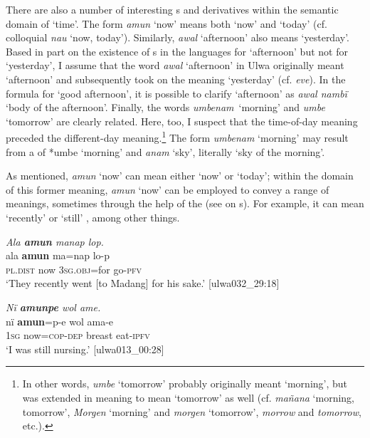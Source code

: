   There are also a number of interesting s and derivatives within the semantic domain of ‘time’. The form \textit{amun} ‘now’ means both ‘now’ and ‘today’ (cf. colloquial  \textit{nau} ‘now, today’). Similarly, \textit{awal} ‘afternoon’ also means ‘yesterday’. Based in part on the existence of s in the  languages for ‘afternoon’ but not for ‘yesterday’, I assume that the word \textit{awal} ‘afternoon’ in Ulwa originally meant ‘afternoon’ and subsequently took on the meaning ‘yesterday’ (cf.  \textit{eve}). In the formula for ‘good afternoon’, it is possible to clarify ‘afternoon’ as \textit{awal nambï} ‘body of the afternoon’. Finally, the words \mbox{\textit{umbenam} ‘morning’} and \textit{umbe} ‘tomorrow’ are clearly related. Here, too, I suspect that the time-of-day meaning preceded the different-day meaning.\footnote{In other words, \textit{umbe} ‘tomorrow’ probably originally meant ‘morning’, but was extended in meaning to mean ‘tomorrow’ as well (cf.  \textit{mañana} ‘morning, tomorrow’,  \mbox{\textit{Morgen}} ‘morning’ and \textit{morgen} ‘tomorrow’,  \textit{morrow} and \textit{tomorrow}, etc.).} The form \textit{umbenam} ‘morning’ may result from a  of *umbe ‘morning’ and \textit{anam} ‘sky’, literally ‘sky of the morning’.

  As mentioned, \textit{amun} ‘now’ can mean either ‘now’ or ‘today’; within the domain of this former meaning, \textit{amun} ‘now’ can be employed to convey a range of  meanings, sometimes through the help of the  (see  on s). For example, it can mean ‘recently’  or ‘still’ , among other things.

\ea%
    \label{ex:sem:27}
          \textit{Ala \textbf{amun} manap lop.}\\
\gll    ala      \textbf{amun}  ma=nap    lo-p\\
    \textsc{pl.dist}  now  3\textsc{sg.obj}=for  go-\textsc{pfv}\\
\glt `They recently went [to Madang] for his sake.’ [ulwa032\_29:18]
\z

\ea%
    \label{ex:sem:28}
          \textit{Nï \textbf{amunpe} wol ame.}\\
\gll    nï    \textbf{amun}=p-e    wol  ama-e\\
    1\textsc{sg}  now=\textsc{cop-dep}  breast  eat-\textsc{ipfv}\\
\glt `I was still nursing.’ [ulwa013\_00:28]
\z

